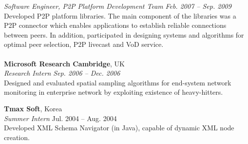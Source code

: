 \documentclass[margin,line]{res}
\begin{document}
\begin{resume}
{\em Software Engineer, P2P Platform Development Team} \hfill {\it Feb. 2007 -- Sep. 2009}\\
Developed P2P platform libraries. %
The main component of the libraries was a P2P connector which enables applications to establish reliable connections between peers. 
In addition, participated in designing systems and algorithms for optimal peer
selection, P2P livecast and VoD service.\\\\

{\bf Microsoft Research Cambridge}, UK \\
{\em Research Intern} \hfill {\it Sep. 2006 -- Dec. 2006} \\
Designed and evaluated spatial sampling algorithms for end-system network monitoring in enterprise network by exploiting existence of heavy-hitters. 



{\bf Tmax Soft}, Korea\\
{\em Summer Intern} \hfill {\sc Jul. 2004 -- Aug. 2004}\\
Developed XML Schema Navigator (in Java), capable of dynamic XML node creation.\\



\end{resume}
\end{document}
